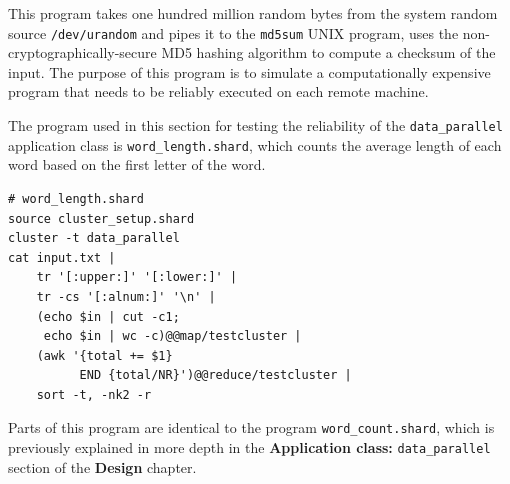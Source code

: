\documentclass[twoside]{report}
\begin{document}
This program takes one hundred million random bytes from the system random source \texttt{/dev/urandom} and pipes it to the \texttt{md5sum} UNIX program, uses the non-cryptographically-secure MD5 hashing algorithm to compute a checksum of the input.
The purpose of this program is to simulate a computationally expensive program that needs to be reliably executed on each remote machine.

\begin{sloppypar}
  The program used in this section for testing the reliability of the \texttt{data\_parallel} application class is \texttt{word\_length.shard}, which counts the average length of each word based on the first letter of the word.
\end{sloppypar}

\begin{minipage}[c]{\textwidth-15pt}
  \begin{lstlisting}[language=Shard]
# word_length.shard
source cluster_setup.shard
cluster -t data_parallel
cat input.txt |
    tr '[:upper:]' '[:lower:]' |
    tr -cs '[:alnum:]' '\n' |
    (echo $in | cut -c1;
     echo $in | wc -c)@@map/testcluster |
    (awk '{total += $1}
          END {total/NR}')@@reduce/testcluster |
    sort -t, -nk2 -r
\end{lstlisting}
  \smallskip
\end{minipage}

Parts of this program are identical to the program \texttt{word\_count.shard}, which is previously explained in more depth in the \textbf{Application class: }\texttt{data\_parallel} section of the \textbf{Design} chapter.
\end{document}
